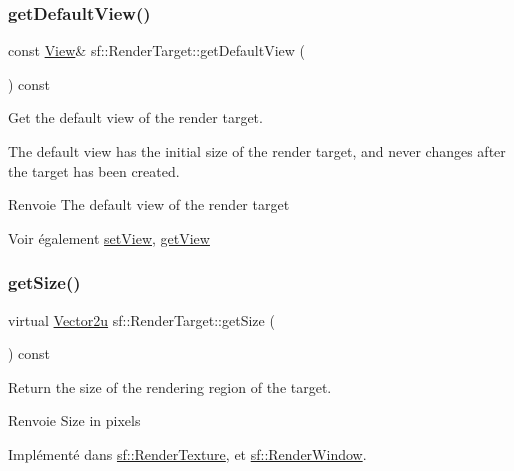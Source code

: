 \subsubsection{\texorpdfstring{get\+Default\+View()}{getDefaultView()}}
{\footnotesize\ttfamily const \hyperlink{classsf_1_1View}{View}\& sf\+::\+Render\+Target\+::get\+Default\+View (\begin{DoxyParamCaption}{ }\end{DoxyParamCaption}) const}



Get the default view of the render target. 

The default view has the initial size of the render target, and never changes after the target has been created.

\begin{DoxyReturn}{Renvoie}
The default view of the render target
\end{DoxyReturn}
\begin{DoxySeeAlso}{Voir également}
\hyperlink{classsf_1_1RenderTarget_a063db6dd0a14913504af30e50cb6d946}{set\+View}, \hyperlink{classsf_1_1RenderTarget_a2c179503b4dcdf5282ef6426d317602c}{get\+View} 
\end{DoxySeeAlso}
\mbox{\label{classsf_1_1RenderTarget_a2e5ade2457d9fb4c4907ae5b3d9e94a5}} 
\subsubsection{\texorpdfstring{get\+Size()}{getSize()}}
{\footnotesize\ttfamily virtual \hyperlink{classsf_1_1Vector2}{Vector2u} sf\+::\+Render\+Target\+::get\+Size (\begin{DoxyParamCaption}{ }\end{DoxyParamCaption}) const\hspace{0.3cm}{\ttfamily [pure virtual]}}



Return the size of the rendering region of the target. 

\begin{DoxyReturn}{Renvoie}
Size in pixels 
\end{DoxyReturn}


Implémenté dans \hyperlink{classsf_1_1RenderTexture_a6685315b5c4c25a5dcb75b4280b381ba}{sf\+::\+Render\+Texture}, et \hyperlink{classsf_1_1RenderWindow_ae3eacf93661c8068fca7a78d57dc7e14}{sf\+::\+Render\+Window}.

